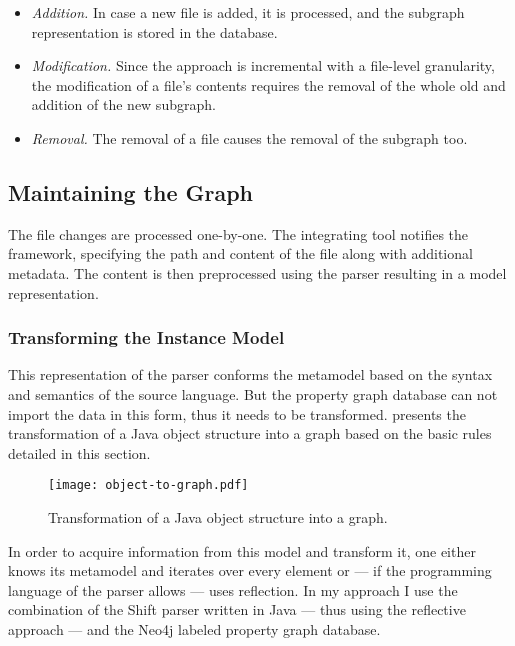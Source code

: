 \begin{itemize}[topsep=0pt]
  \item \emph{Addition.} In case a new file is added, it is processed, and the subgraph representation is stored in the database.

  \item \emph{Modification.} Since the approach is incremental with a file-level granularity, the modification of a file's contents requires the removal of the whole old and addition of the new subgraph.

  \item \emph{Removal.} The removal of a file causes the removal of the subgraph too.
\end{itemize}

\subsection{Maintaining the Graph}
\label{sect:maintaining-the-graph}

The file changes are processed one-by-one. The integrating tool notifies the framework, specifying the path and content of the file along with additional metadata. The content is then preprocessed using the parser resulting in a model representation.

\subsubsection{Transforming the Instance Model}
This representation of the parser conforms the metamodel based on the syntax and semantics of the source language. But the property graph database can not import the data in this form, thus it needs to be transformed.  presents the transformation of a Java object structure into a graph based on the basic rules detailed in this section.

\begin{figure}[!htb]
  \centering
  \texttt{[image: object-to-graph.pdf]}
  \caption{Transformation of a Java object structure into a graph.}
  \label{fig:object-to-graph}
\end{figure}

In order to acquire information from this model and transform it, one either knows its metamodel and iterates over every element or --- if the programming language of the parser allows --- uses reflection. In my approach I use the combination of the Shift parser written in Java --- thus using the reflective approach --- and the Neo4j labeled property graph database.

